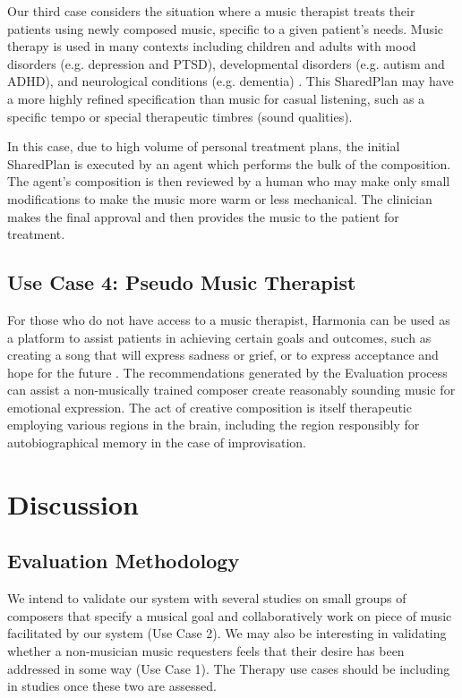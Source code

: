 \documentclass[final,authoryear,5p,times,twocolumn]{elsarticle}
\begin{document}
Our third case considers the situation where a music therapist treats their patients using newly composed music, specific to a given patient's needs. Music therapy is used in many contexts including children and adults with mood disorders (e.g. depression and PTSD), developmental disorders (e.g. autism and ADHD), and neurological conditions (e.g. dementia) \citep{hole2015music}. This SharedPlan may have a more highly refined specification than music for casual listening, such as a specific tempo or special therapeutic timbres (sound qualities). 

In this case, due to high volume of personal treatment plans, the initial SharedPlan is executed by an agent which performs the bulk of the composition. The agent's composition is then reviewed by a human who may make only small modifications to make the music more warm or less mechanical. The clinician makes the final approval and then provides the music to the patient for treatment.

\subsection{Use Case 4: Pseudo Music Therapist}

For those who do not have access to a music therapist, Harmonia can be used as a platform to assist patients in achieving certain goals and outcomes, such as creating a song that will express sadness or grief, or to express acceptance and hope for the future \citep{dalton2006grief}. The recommendations generated by the Evaluation process can assist a non-musically trained composer create reasonably sounding music for emotional expression. The act of creative composition is itself therapeutic employing various regions in the brain, including the region responsibly for autobiographical memory in the case of improvisation. \citep{hilliard2001effects,bensimon2008drumming,limb2008neural,carr2012group} 

\section{Discussion}

\subsection{Evaluation Methodology}

 
We intend to validate our system with several studies on small groups of composers that specify a musical goal and collaboratively work on piece of music facilitated by our system (Use Case 2). We may also be interesting in validating whether a non-musician music requesters feels that their desire has been addressed in some way (Use Case 1). The Therapy use cases should be including in studies once these two are assessed.
\end{document}
